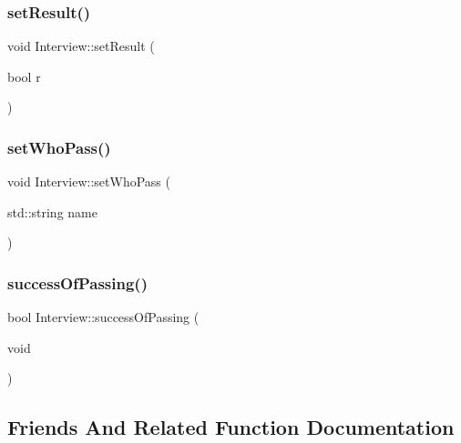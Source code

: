 \hypertarget{class_interview_abbd0885e4e3823bb65951cc0bb647d6b}{}\label{class_interview_abbd0885e4e3823bb65951cc0bb647d6b} 
\subsubsection{\texorpdfstring{set\+Result()}{setResult()}}
{\footnotesize\ttfamily void Interview\+::set\+Result (\begin{DoxyParamCaption}\item[{bool}]{r }\end{DoxyParamCaption})\hspace{0.3cm}{\ttfamily [inline]}}

\hypertarget{class_interview_ae7b385238b18a719812f41ea96040c3e}{}\label{class_interview_ae7b385238b18a719812f41ea96040c3e} 
\subsubsection{\texorpdfstring{set\+Who\+Pass()}{setWhoPass()}}
{\footnotesize\ttfamily void Interview\+::set\+Who\+Pass (\begin{DoxyParamCaption}\item[{std\+::string}]{name }\end{DoxyParamCaption})\hspace{0.3cm}{\ttfamily [inline]}}

\hypertarget{class_interview_a20d7ee5c6fd7c030857b21c39b1d1e1b}{}\label{class_interview_a20d7ee5c6fd7c030857b21c39b1d1e1b} 
\subsubsection{\texorpdfstring{success\+Of\+Passing()}{successOfPassing()}}
{\footnotesize\ttfamily bool Interview\+::success\+Of\+Passing (\begin{DoxyParamCaption}\item[{void}]{ }\end{DoxyParamCaption})\hspace{0.3cm}{\ttfamily [inline]}}



\subsection{Friends And Related Function Documentation}
\hypertarget{class_interview_aa32d4e45baf6b6c73433889c6988079f}{}\label{class_interview_aa32d4e45baf6b6c73433889c6988079f} 
